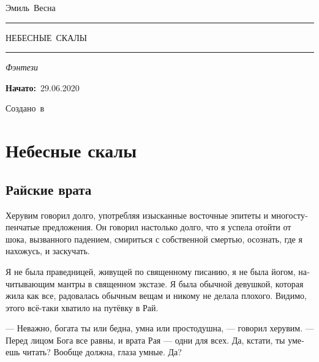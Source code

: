 \documentclass[a4paper,12pt,fleqn]{book}\usepackage{polyglossia}\setdefaultlanguage[babelshorthands=true]{russian}\setotherlanguage{english}\defaultfontfeatures{Ligatures=TeX,Mapping=tex-text}\usepackage{xcolor}\newcommand{\ml}[3]{#2}
\newcommand{\tofaauthor}{\ml{$0$}{Эмиль~Весна}{Emil~Viesn\'{a}}}
\newcommand{\tofatitle}{\ml{$0$}{НЕБЕСНЫЕ~СКАЛЫ}{The~Skycliff}}
\newcommand{\tofastarted}{29.06.2020}
\newcommand{\asterism}{\vspace{1em}{\centering\Large\bfseries$\ast~\ast~\ast$\par}\vspace{1em}}
\begin{document}
 

\begin{titlepage}
{\centering{~\par}\vspace{0.25\textheight}
{\LARGE\tofaauthor}\par
\vspace{1.0cm}\rule{17em}{1pt}\par\vspace{0.3cm}
{\Huge\textsc{\tofatitle}\par}
\vspace{0.3cm}\rule{17em}{2pt}\par\vspace{1.0cm}
{\Large\textit{\ml{$0$}{Фэнтези}{Fantasy}}\par}
\vspace{0.5cm}\asterism\par\vspace{1.0cm}
{\textbf{\ml{$0$}{Начато:}{Started:}}~\tofastarted\par}\vfill
{\Large\ml{$0$}{Создано~в}{Created~by}~\XeLaTeX}\par}
\end{titlepage}

\tableofcontents

\chapter{Небесные скалы}

\section{Райские врата}

Херувим говорил долго, употребляя изысканные восточные эпитеты и многоступенчатые предложения.
Он говорил настолько долго, что я успела отойти от шока, вызванного падением, смириться с собственной смертью, осознать, где я нахожусь, и заскучать.

Я не была праведницей, живущей по священному писанию, я не была йогом, начитывающим мантры в священном экстазе.
Я была обычной девушкой, которая жила как все, радовалась обычным вещам и никому не делала плохого.
Видимо, этого всё-таки хватило на путёвку в Рай.

--- Неважно, богата ты или бедна, умна или простодушна, --- говорил херувим.
--- Перед лицом Бога все равны, и врата Рая --- одни для всех.
Да, кстати, ты умеешь читать?
Вообще должна, глаза умные.
Да?
\end{document}

